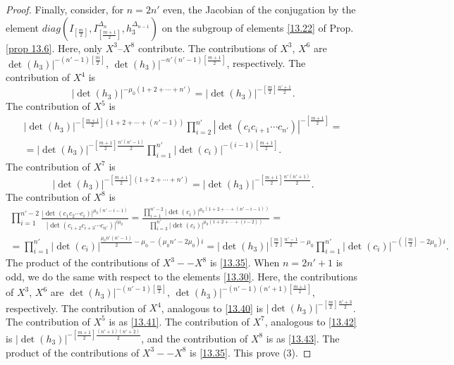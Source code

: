 \documentclass[12pts]{amsart}
\begin{document}
\begin{proof}
Finally, consider, for $n=2n'$ even, the Jacobian of the conjugation by the element $diag(I_{[\frac{m}{2}]},I_{[\frac{m+1}{2}]}^{\Delta_n},h_3^{\Delta_{n-1}})$ on the subgroup of elements \eqref{13.22} of Prop. \ref{prop 13.6}. Here, only $X^3$--$X^8$ contribute. The contributions of $X^3$, $X^6$ are $\det(h_3)|^{-(n'-1)[\frac{m}{2}]}$, $\det(h_3)|^{-n'(n'-1)[\frac{m+1}{2}]}$, respectively. The contribution of $X^4$ is
\begin{equation}\label{13.40}
|\det(h_3)|^{-\mu_0(1+2+\cdots+n')}=|\det(h_3)|^{-[\frac{m}{2}]\frac{n'+1}{2}}.
\end{equation}
The contribution of $X^5$ is
\begin{multline}\label{13.41}
|\det(h_3)|^{-[\frac{m+1}{2}](1+2+\cdots+(n'-1))}\prod_{i=2}^{n'}|\det(c_ic_{i+1}\cdots c_{n'})|^{-[\frac{m+1}{2}]}=\\
=|\det(h_3)|^{-[\frac{m+1}{2}]\frac{n'(n'-1)}{2}}\prod_{i=1}^{n'}|\det(c_i)|^{-(i-1)[\frac{m+1}{2}]}.
\end{multline}
The contribution of $X^7$ is
\begin{equation}\label{13.42}
|\det(h_3)|^{-[\frac{m+1}{2}](1+2+\cdots+n')}=|\det(h_3)|^{-[\frac{m+1}{2}]\frac{n'(n'+1)}{2}}.
\end{equation}
The contribution of $X^8$ is
\begin{multline}\label{13.43}
\prod_{i=1}^{n'-2}\frac{|\det(c_1c_2\cdots c_i)|^{\mu_0(n'-i-1)}}{|\det(c_{i+2}c_{i+3}\cdots c_{n'})|^{i\mu_0}}=\frac{\prod_{i=1}^{n'-2}|\det(c_i)|^{\mu_0(1+2+\cdots+(n'-i-1))}}{\prod_{i=3}^{n'}|\det(c_i)|^{\mu_0(1+2+\cdots+(i-2))}}=\\
=\prod_{i=1}^{n'}|\det(c_i)|^{\frac{\mu_0n'(n'-1)}{2}-\mu_0-(\mu_0n'-2\mu_0)i}=|\det(h_3)|^{[\frac{m}{2}]\frac{n'-1}{2}-\mu_0}\prod_{i=1}^{n'}|\det(c_i)|^{-([\frac{m}{2}]-2\mu_0)i}.
\end{multline}
The product of the contributions of $X^3--X^8$ is \eqref{13.35}. When $n=2n'+1$ is odd, we do the same with respect to the elements \eqref{13.30}. Here, the contributions of $X^3$, $X^6$ are $\det(h_3)|^{-(n'-1)[\frac{m}{2}]}$, $\det(h_3)|^{-(n'-1)(n'+1)[\frac{m+1}{2}]}$, respectively. The contribution of $X^4$, analogous to \eqref{13.40} is $|\det(h_3)|^{-[\frac{m}{2}]\frac{n'+3}{2}}$. The contribution of $X^5$ is as \eqref{13.41}. The contribution of $X^7$, analogous to \eqref{13.42} is
$|\det(h_3)|^{-[\frac{m+1}{2}]\frac{(n'+1)(n'+2)}{2}}$, and the contribution of $X^8$ is as \eqref{13.43}. The product of the contributions of $X^3--X^8$ is \eqref{13.35}. This prove (3).

\end{proof}
\end{document}
